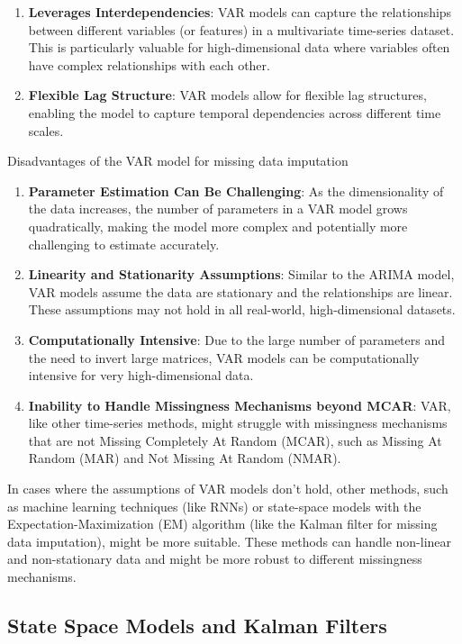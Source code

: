 \documentclass[a4paper,12pt,twoside,openright]{report}
\begin{document}
\begin{enumerate}
    \item \textbf{Leverages Interdependencies}: VAR models can capture the relationships between different variables (or features) in a multivariate time-series dataset. This is particularly valuable for high-dimensional data where variables often have complex relationships with each other.
    \item \textbf{Flexible Lag Structure}: VAR models allow for flexible lag structures, enabling the model to capture temporal dependencies across different time scales.
\end{enumerate}

Disadvantages of the VAR model for missing data imputation

\begin{enumerate}
    \item \textbf{Parameter Estimation Can Be Challenging}: As the dimensionality of the data increases, the number of parameters in a VAR model grows quadratically, making the model more complex and potentially more challenging to estimate accurately.
    \item \textbf{Linearity and Stationarity Assumptions}: Similar to the ARIMA model, VAR models assume the data are stationary and the relationships are linear. These assumptions may not hold in all real-world, high-dimensional datasets.
    \item \textbf{Computationally Intensive}: Due to the large number of parameters and the need to invert large matrices, VAR models can be computationally intensive for very high-dimensional data.
    \item \textbf{Inability to Handle Missingness Mechanisms beyond MCAR}: VAR, like other time-series methods, might struggle with missingness mechanisms that are not Missing Completely At Random (MCAR), such as Missing At Random (MAR) and Not Missing At Random (NMAR).
\end{enumerate}

In cases where the assumptions of VAR models don't hold, other methods, such as machine learning techniques (like RNNs) or state-space models with the Expectation-Maximization (EM) algorithm (like the Kalman filter for missing data imputation), might be more suitable. These methods can handle non-linear and non-stationary data and might be more robust to different missingness mechanisms.

\subsection{State Space Models and Kalman Filters}
\end{document}
